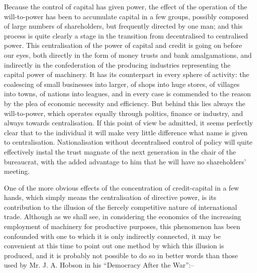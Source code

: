 \documentclass{book}
\begin{document}
Because the control of capital has given power, the effect of the operation of the will-to-power has been to accumulate capital in a few groups, possibly composed of large numbers of shareholders, but frequently directed by one man; and this process is quite clearly a stage in the transition from decentralised to centralised power. This centralisation of the power of capital and credit is going on before our eyes, both directly in the form of money trusts and bank amalgamations, and indirectly in the confederation of the producing industries representing the capital power of machinery. It has its counterpart in every sphere of activity: the coalescing of small businesses into larger, of shops into huge stores, of villages into towns, of nations into leagues, and in every case is commended to the reason by the plea of economic necessity and efficiency. But behind this lies always the will-to-power, which operates equally through politics, finance or industry, and always towards centralisation. If this point of view be admitted, it seems perfectly clear that to the individual it will make very little difference what name is given to centralisation. Nationalisation without decentralised control of policy will quite effectively instal the trust magnate of the next generation in the chair of the bureaucrat, with the added advantage to him that he will have no shareholders’ meeting.

One of the more obvious effects of the concentration of credit-capital in a few hands, which simply means the centralisation of directive power, is its contribution to the illusion of the fiercely competitive nature of international trade. Although as we shall see, in considering the economics of the increasing employment of machinery for productive purposes, this phenomenon has been confounded with one to which it is only indirectly connected, it may be convenient at this time to point out one method by which this illusion is produced, and it is probably not possible to do so in better words than those used by Mr. J. A. Hobson in his “Democracy After the War”:–
\end{document}
